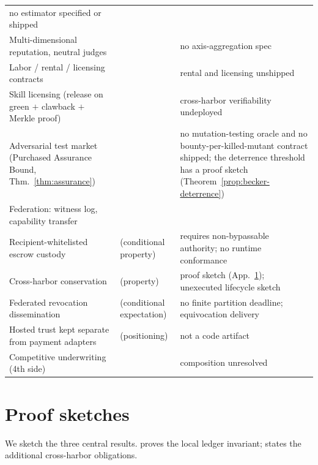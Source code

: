 \documentclass[11pt,a4paper]{article}
\theoremstyle{definition}
\theoremstyle{definition}
\theoremstyle{remark}
\begin{document}
{\begin{xltabular}{\textwidth}{@{}>{\raggedright\arraybackslash}X l >{\raggedright\arraybackslash}p{0.31\textwidth}@{}}
  no estimator specified or shipped \\
Multi-dimensional reputation, neutral judges & \Vision{} & no axis-aggregation spec \\
Labor / rental / licensing contracts & \Designed{} & rental and licensing unshipped \\
Skill licensing (release on green $+$ clawback $+$ Merkle proof) & \Designed{} &
  cross-harbor verifiability undeployed \\
Adversarial test market (Purchased Assurance Bound, Thm.~\ref{thm:assurance}) &
  \Vision{} & no mutation-testing oracle and no bounty-per-killed-mutant contract
  shipped; the deterrence threshold has a proof sketch
  (Theorem~\ref{prop:becker-deterrence}) \\
Federation: witness log, capability transfer & \Designed{} &  \\
Recipient-whitelisted escrow custody & \Designed{} (conditional property) &
  requires non-bypassable authority; no runtime conformance \\
Cross-harbor conservation & \Designed{} (property) & proof sketch
  (App.~\ref{app:proofs}); unexecuted lifecycle sketch \\
Federated revocation dissemination & \Designed{} (conditional expectation) & no finite partition deadline; equivocation delivery \Open{} \\
Hosted trust kept separate from payment adapters & \Designed{} (positioning) & not a code artifact \\
Competitive underwriting (4th side) & \Vision{} & composition unresolved \\
\end{xltabular}}

\section{Proof sketches}\label{app:proofs}

We sketch the three central results. 
proves the local ledger invariant; 
states the additional cross-harbor obligations.
\end{document}
